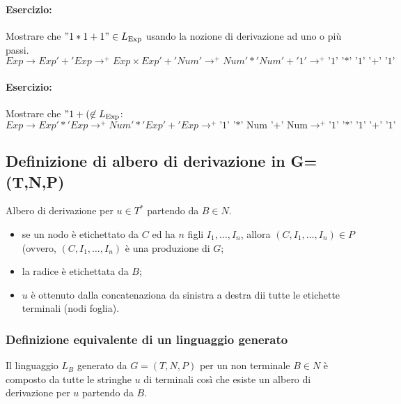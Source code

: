 \paragraph{Esercizio:}
Mostrare che $"1*1+1"\in L_{\text{Exp}}$ usando la nozione di
derivazione ad uno o più passi.
\[
  Exp\rightarrow Exp'+'Exp\rightarrow^+ Exp\times Exp'+'Num'
  \rightarrow^+ Num'*'Num'+'1'
  \rightarrow^+ \text{'1' '*' '1' '+' '1'}
\]
\paragraph{Esercizio:}
Mostrare che $"1+(\not\in L_{\text{Exp}}$:
\[
  Exp\rightarrow Exp '*' Exp\rightarrow^+ Num '*' Exp '+' Exp \rightarrow^+
\text{'1' '*' Num '+' Num}\rightarrow^+\text{'1' '*' '1' '+' '1'}
\]

\subsection{Definizione di albero di derivazione in G=(T,N,P)}
Albero di derivazione per $u\in T^*$ partendo da $B\in N$.
\begin{itemize}
  \item se un nodo è etichettato da $C$ ed ha $n$ figli $I_1,\dots,I_n$,
    allora $(C,I_1,\dots,I_n)\in P$ (ovvero, $(C,I_1,\dots,I_n)$ è una
    produzione di $G$;
  \item la radice è etichettata da $B$;
  \item $u$ è ottenuto dalla concatenaziona da sinistra a destra dii tutte le
    etichette terminali (nodi foglia).
\end{itemize}

\subsubsection{Definizione equivalente di un linguaggio generato}
Il linguaggio $L_B$ generato da $G=(T,N,P)$ per un non terminale $B\in N$ è
composto da tutte le stringhe $u$ di terminali così che esiste un albero di
derivazione per $u$ partendo da $B$.
